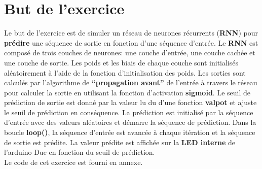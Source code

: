 \documentclass[a4paper, 12pt, openany]{book}
\begin{document}
\section{But de l'exercice}
Le but de l'exercice est de simuler un réseau de neurones récurrents (\textbf{RNN}) pour \textbf{prédire} une séquence de sortie en fonction d'une séquence d'entrée. 
Le \textbf{RNN} est composé de trois couches de neurones: une couche d'entrée, une couche cachée et une
couche de sortie. Les poids et les biais de chaque couche sont initialisés aléatoirement à l'aide
de la fonction d'initialisation des poids. Les sorties sont calculés par l'algorithme de
\textbf{``propagation avant''} de l'entrée à travers le réseau pour calculer la sortie en utilisant la fonction
d'activation \textbf{sigmoid}. Le seuil de prédiction de sortie est donné par la valeur lu du d'une
fonction \textbf{valpot} et ajuste le seuil de prédiction en conséquence. La prédiction est initialisé par
la séquence d'entrée avec des valeurs aléatoires et démarre la séquence de prédiction. Dans
la boucle \textbf{loop()}, la séquence d'entrée est avancée à chaque itération et la séquence de sortie
est prédite. La valeur prédite est affichée sur la \textbf{LED interne} de l'arduino Due en fonction du
seuil de prédiction. \\

Le code de cet exercice est fourni en annexe.
\end{document}
